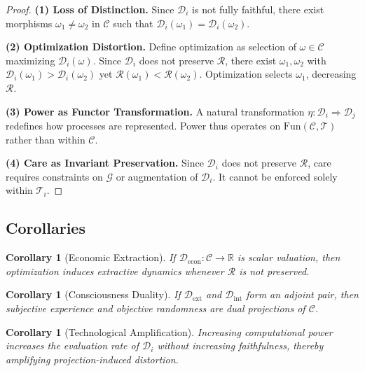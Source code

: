 \documentclass[11pt,a4paper]{article}
\newtheorem{corollary}[theorem]{Corollary}
\theoremstyle{definition}
\theoremstyle{remark}
\begin{document}
\begin{proof}
\textbf{(1) Loss of Distinction.} Since $\mathcal{D}_i$ is not fully faithful, there exist morphisms $\omega_1 \neq \omega_2$ in $\mathcal{C}$ such that $\mathcal{D}_i(\omega_1) = \mathcal{D}_i(\omega_2)$.

\textbf{(2) Optimization Distortion.} Define optimization as selection of $\omega \in \mathcal{C}$ maximizing $\mathcal{D}_i(\omega)$. Since $\mathcal{D}_i$ does not preserve $\mathcal{R}$, there exist $\omega_1, \omega_2$ with $\mathcal{D}_i(\omega_1) > \mathcal{D}_i(\omega_2)$ yet $\mathcal{R}(\omega_1) < \mathcal{R}(\omega_2)$. Optimization selects $\omega_1$, decreasing $\mathcal{R}$.

\textbf{(3) Power as Functor Transformation.} A natural transformation $\eta : \mathcal{D}_i \Rightarrow \mathcal{D}_j$ redefines how processes are represented. Power thus operates on $\mathrm{Fun}(\mathcal{C}, \mathcal{T})$ rather than within $\mathcal{C}$.

\textbf{(4) Care as Invariant Preservation.} Since $\mathcal{D}_i$ does not preserve $\mathcal{R}$, care requires constraints on $\mathcal{G}$ or augmentation of $\mathcal{D}_i$. It cannot be enforced solely within $\mathcal{T}_i$.
\end{proof}

\subsection{Corollaries}

\begin{corollary}[Economic Extraction]
If $\mathcal{D}_{\mathrm{econ}} : \mathcal{C} \to \mathbb{R}$ is scalar valuation, then optimization induces extractive dynamics whenever $\mathcal{R}$ is not preserved.
\end{corollary}

\begin{corollary}[Consciousness Duality]
If $\mathcal{D}_{\mathrm{ext}}$ and $\mathcal{D}_{\mathrm{int}}$ form an adjoint pair, then subjective experience and objective randomness are dual projections of $\mathcal{C}$.
\end{corollary}

\begin{corollary}[Technological Amplification]
Increasing computational power increases the evaluation rate of $\mathcal{D}_i$ without increasing faithfulness, thereby amplifying projection-induced distortion.
\end{corollary}
\end{document}
